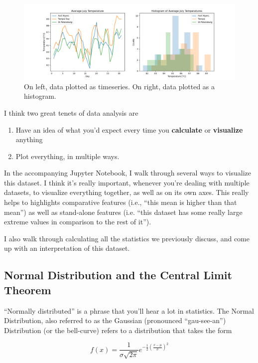 \documentclass{article}
\begin{document}
\begin{figure}[htbp]
\centerline{\includegraphics[width = \textwidth]{distex.png}}
\caption[]{\label{fig:ex} On left, data plotted as timeseries. On right, data plotted as a histogram. }
\end{figure}

I think two great tenets of data analysis are
\begin{enumerate}
\item Have an idea of what you'd expect every time you \textbf{calculate} or \textbf{visualize} anything
\item\label{item:5} Plot everything, in multiple ways. 
\end{enumerate}

In the accompanying Jupyter Notebook, I walk through several ways to visualize this dataset. I think it's really important, whenever you're dealing with multiple datasets, to visualize everything together, as well as on its own axes. This really helps to highlights comparative features (i.e., ``this mean is higher than that mean'') as well as stand-alone features (i.e. ``this dataset has some really large extreme values in comparison to the rest of it'').

I also walk through calculating all the statistics we previously discuss, and come up with an interpretation of this dataset.

\subsection{Normal Distribution and the Central Limit Theorem}
``Normally distributed'' is a phrase that you'll hear a lot in statistics. The Normal Distribution, also referred to as the Gaussian (pronounced ``gau-see-an'') Distribution (or the bell-curve) refers to a distribution that takes the form

\begin{equation}
\label{eq:13}
f(x) = \frac{1}{\sigma\sqrt{2\pi}}e^{-\frac{1}{2} \left( \frac{x - \mu}{\sigma} \right)^{2}}
\end{equation}
\end{document}

